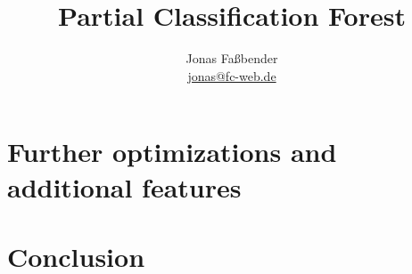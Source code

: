 \documentclass[journal]{IEEEtran}
\title{Partial Classification Forest}
\author{Jonas Fa{\ss}bender \\ [1ex]
  \href{mailto: jonas@fc-web.de}{jonas@fc-web.de}}
\date{}
\begin{document}
\maketitle

\begin{abstract}
\end{abstract}









\section{Further optimizations and additional features}
\label{sec:oandf}

\section{Conclusion}
\label{sec:conclusion}


\end{document}
